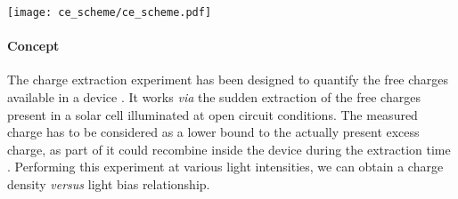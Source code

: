 \begin{SCfigure}
	\centering
	\texttt{[image: ce\_scheme/ce\_scheme.pdf]}
	\label{fig:ce_scheme}
\end{SCfigure}


	\paragraph{Concept}
	The charge extraction experiment has been designed to quantify the free charges available in a device \cite{Duffy2000,Barnes2011}.
	It works \textsl{via} the sudden extraction of the free charges present in a solar cell illuminated at open circuit conditions.
	The measured charge has to be considered as a lower bound to the actually present excess charge, as part of it could recombine inside the device during the extraction time \cite{ORegan2005}.
	Performing this experiment at various light intensities, we can obtain a charge density \textsl{versus} light bias relationship.

